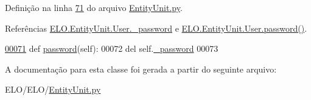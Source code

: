 Definição na linha \hyperlink{EntityUnit_8py_source_l00071}{71} do arquivo \hyperlink{EntityUnit_8py_source}{Entity\+Unit.\+py}.



Referências \hyperlink{EntityUnit_8py_source_l00055}{E\+L\+O.\+Entity\+Unit.\+User.\+\_\+password} e \hyperlink{classELO_1_1EntityUnit_1_1User_afa4958003d3a9ad26ff67a5f05fc2d8b}{E\+L\+O.\+Entity\+Unit.\+User.\+password()}.


\begin{DoxyCode}
\hypertarget{classELO_1_1EntityUnit_1_1User_l00071}{}\hyperlink{classELO_1_1EntityUnit_1_1User_afa4958003d3a9ad26ff67a5f05fc2d8b}{00071}     \textcolor{keyword}{def }\hyperlink{classELO_1_1EntityUnit_1_1User_afa4958003d3a9ad26ff67a5f05fc2d8b}{password}(self):
00072         del self.\hyperlink{classELO_1_1EntityUnit_1_1User_a084a787c085aa13221a2c3b08132a0b5}{\_password}
00073 
\end{DoxyCode}


A documentação para esta classe foi gerada a partir do seguinte arquivo\+:\begin{DoxyCompactItemize}
\item 
E\+L\+O/\+E\+L\+O/\hyperlink{EntityUnit_8py}{Entity\+Unit.\+py}\end{DoxyCompactItemize}
